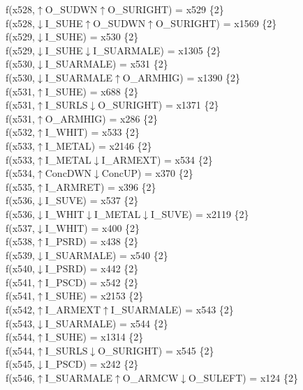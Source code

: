 f(x528,$\uparrow$O\_SUDWN$\uparrow$O\_SURIGHT) = x529 \{2\} \\  
f(x528,$\downarrow$I\_SUHE$\uparrow$O\_SUDWN$\uparrow$O\_SURIGHT) = x1569 \{2\} \\  
f(x529,$\downarrow$I\_SUHE) = x530 \{2\} \\  
f(x529,$\downarrow$I\_SUHE$\downarrow$I\_SUARMALE) = x1305 \{2\} \\  
f(x530,$\downarrow$I\_SUARMALE) = x531 \{2\} \\  
f(x530,$\downarrow$I\_SUARMALE$\uparrow$O\_ARMHIG) = x1390 \{2\} \\  
f(x531,$\uparrow$I\_SUHE) = x688 \{2\} \\  
f(x531,$\uparrow$I\_SURLS$\downarrow$O\_SURIGHT) = x1371 \{2\} \\  
f(x531,$\uparrow$O\_ARMHIG) = x286 \{2\} \\  
f(x532,$\uparrow$I\_WHIT) = x533 \{2\} \\  
f(x533,$\uparrow$I\_METAL) = x2146 \{2\} \\  
f(x533,$\uparrow$I\_METAL$\downarrow$I\_ARMEXT) = x534 \{2\} \\  
f(x534,$\uparrow$ConcDWN$\downarrow$ConcUP) = x370 \{2\} \\  
f(x535,$\uparrow$I\_ARMRET) = x396 \{2\} \\  
f(x536,$\downarrow$I\_SUVE) = x537 \{2\} \\  
f(x536,$\downarrow$I\_WHIT$\downarrow$I\_METAL$\downarrow$I\_SUVE) = x2119 \{2\} \\  
f(x537,$\downarrow$I\_WHIT) = x400 \{2\} \\  
f(x538,$\uparrow$I\_PSRD) = x438 \{2\} \\  
f(x539,$\downarrow$I\_SUARMALE) = x540 \{2\} \\  
f(x540,$\downarrow$I\_PSRD) = x442 \{2\} \\  
f(x541,$\uparrow$I\_PSCD) = x542 \{2\} \\  
f(x541,$\uparrow$I\_SUHE) = x2153 \{2\} \\  
f(x542,$\uparrow$I\_ARMEXT$\uparrow$I\_SUARMALE) = x543 \{2\} \\  
f(x543,$\downarrow$I\_SUARMALE) = x544 \{2\} \\  
f(x544,$\uparrow$I\_SUHE) = x1314 \{2\} \\  
f(x544,$\uparrow$I\_SURLS$\downarrow$O\_SURIGHT) = x545 \{2\} \\  
f(x545,$\downarrow$I\_PSCD) = x242 \{2\} \\  
f(x546,$\uparrow$I\_SUARMALE$\uparrow$O\_ARMCW$\downarrow$O\_SULEFT) = x124 \{2\} \\  
